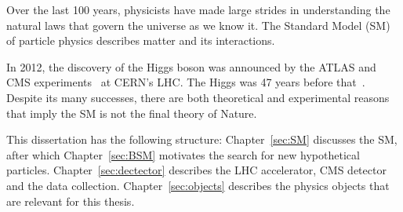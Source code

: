 

\label{sec:introduction}

Over the last 100 years, physicists have made large strides in understanding the natural laws that govern the universe as we know it. The Standard Model (SM) of particle physics describes matter and its interactions.

In 2012, the discovery of the Higgs boson was announced by the ATLAS and CMS experiments~\cite{Higgs_discovery_2012_CMS,Higgs_discovery_2012_ATLAS,Higgs_discovery_2013_CMS} at CERN's LHC.
The Higgs was 47 years before that~\cite{Higgs_theory1,Higgs_theory2}.
Despite its many successes, there are both theoretical and experimental reasons that imply the SM is not the final theory of Nature.

This dissertation has the following structure:
Chapter~\ref{sec:SM} discusses the SM, after which Chapter~\ref{sec:BSM} motivates the search for new hypothetical particles.
Chapter~\ref{sec:dectector} describes the LHC accelerator, CMS detector and the data collection.
Chapter~\ref{sec:objects} describes the physics objects that are relevant for this thesis.
